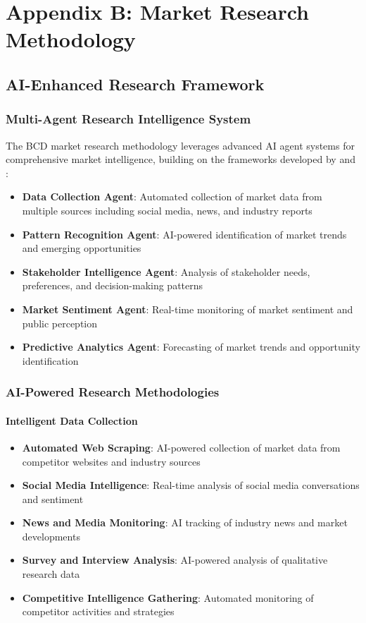 \documentclass[12pt,a4paper]{book}
\begin{document}
\chapter{Appendix B: Market Research Methodology}

\section{AI-Enhanced Research Framework}

\subsection{Multi-Agent Research Intelligence System}

The BCD market research methodology leverages advanced AI agent systems for comprehensive market intelligence, building on the frameworks developed by \citep{wang_user_behavior_analysis} and \citep{liu_resonance_algorithm_an}:

\begin{itemize}
    \item \textbf{Data Collection Agent}: Automated collection of market data from multiple sources including social media, news, and industry reports
    \item \textbf{Pattern Recognition Agent}: AI-powered identification of market trends and emerging opportunities
    \item \textbf{Stakeholder Intelligence Agent}: Analysis of stakeholder needs, preferences, and decision-making patterns
    \item \textbf{Market Sentiment Agent}: Real-time monitoring of market sentiment and public perception
    \item \textbf{Predictive Analytics Agent}: Forecasting of market trends and opportunity identification
\end{itemize}

\subsection{AI-Powered Research Methodologies}

\subsubsection{Intelligent Data Collection}

\begin{itemize}
    \item \textbf{Automated Web Scraping}: AI-powered collection of market data from competitor websites and industry sources
    \item \textbf{Social Media Intelligence}: Real-time analysis of social media conversations and sentiment
    \item \textbf{News and Media Monitoring}: AI tracking of industry news and market developments
    \item \textbf{Survey and Interview Analysis}: AI-powered analysis of qualitative research data
    \item \textbf{Competitive Intelligence Gathering}: Automated monitoring of competitor activities and strategies
\end{itemize}
\end{document}
